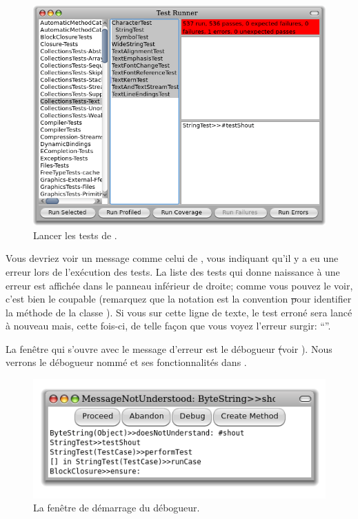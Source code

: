 \documentclass[a4paper,10pt,twoside]{book}
\begin{document}
\begin{figure}[hbt]
\centerline {\includegraphics[width=\textwidth]{testRunnerOnStringTest}}
\caption{Lancer les tests de \mbox{.}
}
\end{figure}

Vous devriez voir un message comme celui de
, vous indiquant qu'il y a eu une erreur
lors de l'exécution des tests. La liste des tests qui donne
naissance à une erreur est affichée dans le panneau inférieur de
droite; comme vous pouvez le voir, c'est bien
 le coupable
(remarquez que la notation  est la 
convention \st pour identifier la méthode de la classe \mbox{).}
Si vous \clickz{} sur cette ligne de texte, le test erroné sera
lancé à nouveau mais, cette fois-ci, de telle façon que vous
voyez l'erreur surgir:
\mbox{``''.}

La fenêtre qui s'ouvre avec le message d'erreur est le débogueur \st (voir ).
Nous verrons le débogueur nommé  et ses
fonctionnalités dans .

\begin{figure}[hbt]

	\centerline {\includegraphics[width=\textwidth]{Predebugger}}
\caption{La fenêtre de démarrage du débogueur.}
\end{figure}
\end{document}
